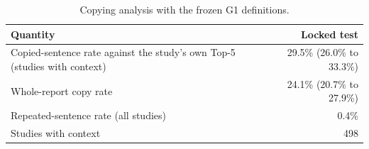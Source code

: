 \begin{table}[t]
\centering
\scriptsize
\begin{tabular}{lr}
\hline
Quantity & Locked test \\
\hline
Copied-sentence rate against the study's own Top-5 (studies with context) & 29.5\% (26.0\% to 33.3\%) \\
Whole-report copy rate & 24.1\% (20.7\% to 27.9\%) \\
Repeated-sentence rate (all studies) & 0.4\% \\
Studies with context & 498 \\
\hline
\end{tabular}
\caption{Copying analysis with the frozen G1 definitions.}
\label{tab:table12_supplementary_copying}
\end{table}
